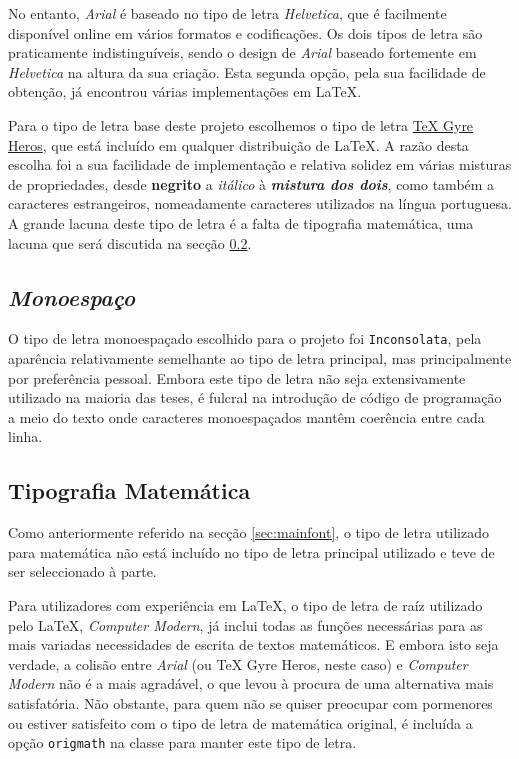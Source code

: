 \documentclass{../ist-thesis}
\begin{document}
No entanto, \textit{Arial} é baseado no tipo de letra \textit{Helvetica}, que é facilmente disponível online em vários formatos e codificações. Os dois tipos de letra são praticamente indistinguíveis, sendo o design de \textit{Arial} baseado fortemente em \textit{Helvetica} na altura da sua criação. Esta segunda opção, pela sua facilidade de obtenção, já encontrou várias implementações em \LaTeX{}.

Para o tipo de letra base deste projeto escolhemos o tipo de letra \href{https://ctan.org/pkg/tex-gyre-heros}{\TeX{} Gyre Heros}, que está incluído em qualquer distribuição de \LaTeX{}. A razão desta escolha foi a sua facilidade de implementação e relativa solidez em várias misturas de propriedades, desde \textbf{negrito} a \textit{itálico} à {\bfseries\itshape mistura dos dois}, como também a caracteres estrangeiros, nomeadamente caracteres utilizados na língua portuguesa. A grande lacuna deste tipo de letra é a falta de tipografia matemática, uma lacuna que será discutida na secção \ref{sec:mathfont}.

\subsection{\textit{Monoespaço}}

O tipo de letra monoespaçado escolhido para o projeto foi \texttt{Inconsolata}, pela aparência relativamente semelhante ao tipo de letra principal, mas principalmente por preferência pessoal. Embora este tipo de letra não seja extensivamente utilizado na maioria das teses, é fulcral na introdução de código de programação a meio do texto onde caracteres monoespaçados mantêm coerência entre cada linha.

\subsection{Tipografia Matemática}
\label{sec:mathfont}

Como anteriormente referido na secção \ref{sec:mainfont}, o tipo de letra utilizado para matemática não está incluído no tipo de letra principal utilizado e teve de ser seleccionado à parte.

Para utilizadores com experiência em \LaTeX{}, o tipo de letra de raíz utilizado pelo \LaTeX{}, \textit{Computer Modern}, já inclui todas as funções necessárias para as mais variadas necessidades de escrita de textos matemáticos. E embora isto seja verdade, a colisão entre \textit{Arial} (ou \TeX{} Gyre Heros, neste caso) e \textit{Computer Modern} não é a mais agradável, o que levou à procura de uma alternativa mais satisfatória. Não obstante, para quem não se quiser preocupar com pormenores ou estiver satisfeito com o tipo de letra de matemática original, é incluída a opção \texttt{origmath} na classe para manter este tipo de letra.
\end{document}
